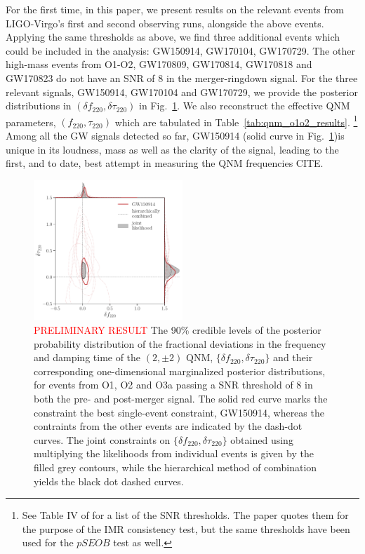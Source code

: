 \documentclass[twocolumn,prd,aps,superscriptaddress,preprintnumbers,tightenlines,showpacs,nofootinbib,eqsecnum,amsfonts,amsmath]{revtex4-1}
\newcommand{\df}[1]{\delta f_{\text{#1}}}
\newcommand{\dtau}[1]{\delta \tau_{\text{#1}}}
\newcommand{\fngr}[1]{f_{\text{#1}}}
\newcommand{\taungr}[1]{\tau_{\text{#1}}}
\begin{document}
For the first time, in this paper, we present results on the relevant events from LIGO-Virgo's first and second observing runs, alongside the above events. Applying the same thresholds as above, we find three additional events which could be included in the analysis: GW150914, GW170104, GW170729. The other high-mass events from O1-O2, GW170809, GW170814, GW170818 and GW170823 do not have an SNR of $8$ in the merger-ringdown signal. For the three relevant signals, GW150914, GW170104 and GW170729, we provide the posterior distributions in $(\df{220}, \dtau{220})$ in Fig.~\ref{fig:o1o2_events}. We also reconstruct the effective QNM parameters, $(\fngr{220}, \taungr{220})$ which are tabulated in Table~\ref{tab:qnm_o1o2_results}. \footnote{See Table IV of \cite{Abbott:2020jks} for a list of the SNR thresholds. The paper quotes them for the purpose of the IMR consistency test, but the same thresholds have been used for the $pSEOB$ test as well.} Among all the GW signals detected so far, GW150914 (solid curve in Fig.~\ref{fig:o1o2_events})is unique in its loudness, mass as well as the clarity of the signal, leading to the first, and to date, best attempt in measuring the QNM frequencies CITE.

\begin{figure}[h!]
	\includegraphics[width=0.5\textwidth]{figures/rin_pseob_results.pdf}
	\caption{\textcolor{red}{PRELIMINARY RESULT} The 90\% credible levels of the posterior probability distribution of the fractional deviations in the frequency and damping time of the $(2,\pm 2)$ QNM, $\{\df{220},\dtau{220}\}$ and their corresponding one-dimensional marginalized posterior distributions, for events from O1, O2 and O3a passing a SNR threshold of $8$ in both the pre- and post-merger signal. The solid red curve marks the constraint the best single-event constraint, GW150914, whereas the contraints from the other events are indicated by the dash-dot curves. The joint constraints on $\{\df{220},\dtau{220}\}$ obtained using multiplying the likelihoods from individual events is given by the filled grey contours, while the hierarchical method of combination yields the black dot dashed curves.}
	\label{fig:o1o2_events}
\end{figure}
\end{document}
